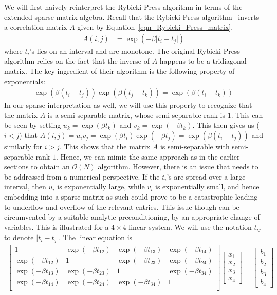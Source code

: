 \documentclass[final,leqno]{siamltex}
\begin{document}
We will first naively reinterpret the Rybicki Press algorithm in terms of the extended sparse matrix algebra. Recall that the Rybicki Press algorithm~\cite{rybicki1995class} inverts a correlation matrix $A$ given by Equation~\eqref{eqn_Rybicki_Press_matrix}.
\begin{align}
A(i,j) & = \exp\left(-\beta \lvert t_i - t_j \rvert\right)
\label{eqn_Rybicki_Press_matrix}
\end{align}
where $t_i$'s lies on an interval and are monotone. The original Rybicki Press algorithm relies on the fact that the inverse of $A$ happens to be a tridiagonal matrix. The key ingredient of their algorithm is the following property of exponentials:
\begin{align}
\exp\left(\beta (t_i-t_j) \right)\exp\left(\beta (t_j-t_k) \right) = \exp\left(\beta (t_i-t_k)\right)
\end{align}
In our sparse interpretation as well, we will use this property to recognize that the matrix $A$ is a semi-separable matrix, whose semi-separable rank is $1$. This can be seen by setting $u_k = \exp(\beta t_k)$ and $v_k = \exp(-\beta t_k)$. This then gives us ($i<j$) that $A(i,j) = u_i v_j = \exp(\beta t_i) \exp(-\beta t_j) = \exp(\beta(t_i-t_j))$ and similarly for $i>j$. This shows that the matrix $A$ is semi-separable with semi-separable rank $1$. Hence, we can mimic the same approach as in the earlier sections to obtain an $\mathcal{O}(N)$ algorithm. However, there is an issue that needs to be addressed from a numerical perspective. If the $t_i$'s are spread over a large interval, then $u_i$ is exponentially large, while $v_i$ is exponentially small, and hence embedding into a sparse matrix as such could prove to be a catastrophic leading to underflow and overflow of the relevant entries. This issue though can be circumvented by a suitable analytic preconditioning, by an appropriate change of variables. This is illustrated for a $4 \times 4$ linear system. We will use the notation $t_{ij}$ to denote $\lvert t_i - t_j\lvert$. The linear equation is
\begin{align}
\begin{bmatrix}
1 & \exp(-\beta t_{12}) & \exp(-\beta t_{13}) & \exp(-\beta t_{14})\\
\exp(-\beta t_{12}) & 1 & \exp(-\beta t_{23}) & \exp(-\beta t_{24})\\
\exp(-\beta t_{13}) & \exp(-\beta t_{23}) & 1 & \exp(-\beta t_{34})\\
\exp(-\beta t_{14}) & \exp(-\beta t_{24}) & \exp(-\beta t_{34}) & 1\\
\end{bmatrix}
\begin{bmatrix}
x_1\\x_2\\x_3\\x_4
\end{bmatrix}
=
\begin{bmatrix}
b_1\\b_2\\b_3\\b_4
\end{bmatrix}
\end{align}
\end{document}
